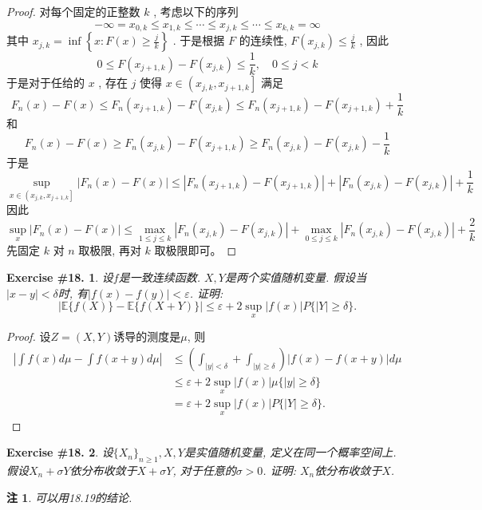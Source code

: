 \documentclass[UTF8, a4paper]{article}
\newtheorem{exercise}{Exercise \#18.}
\newtheorem*{remark}{注}
\begin{document}
\begin{proof}
对每个固定的正整数 $k$ , 考虑以下的序列
$$
-\infty=x_{0, k} \leq x_{1, k} \leq \cdots \leq x_{j, k} \leq \cdots \leq x_{k, k}=\infty
$$
其中 $x_{j, k}=\inf \left\{x: F(x) \geq \frac{j}{k}\right\}$ . 
于是根据 $F$ 的连续性, $F\left(x_{j, k}\right) \leq \frac{j}{k}$ , 因此
$$
0 \leq F\left(x_{j+1, k}\right)-F\left(x_{j, k}\right) \leq \frac{1}{k}, \quad 0 \leq j<k
$$
于是对于任给的 $x$ , 存在 $j$ 使得 $x \in\left(x_{j, k}, x_{j+1, k}\right]$ 满足
$$
F_n(x)-F(x) \leq F_n\left(x_{j+1, k}\right)-F\left(x_{j, k}\right) \leq F_n\left(x_{j+1, k}\right)-F\left(x_{j+1, k}\right)+\frac{1}{k}
$$
和
$$
F_n(x)-F(x) \geq F_n\left(x_{j, k}\right)-F\left(x_{j+1, k}\right) \geq F_n\left(x_{j, k}\right)-F\left(x_{j, k}\right)-\frac{1}{k}
$$
于是
$$
\sup _{x \in\left(x_{j, k}, x_{j+1, k}\right]}\left|F_n(x)-F(x)\right| \leq\left|F_n\left(x_{j+1, k}\right)-F\left(x_{j+1, k}\right)\right|+\left|F_n\left(x_{j, k}\right)-F\left(x_{j, k}\right)\right|+\frac{1}{k}
$$
因此
$$
\sup _x\left|F_n(x)-F(x)\right| \leq \max _{1 \leq j \leq k}\left|F_n\left(x_{j, k}\right)-F\left(x_{j, k}\right)\right|+\max _{0 \leq j \leq k}\left|F_n\left(x_{j, k}\right)-F\left(x_{j, k}\right)\right|+\frac{2}{k}
$$
先固定 $k$ 对 $n$ 取极限, 再对 $k$ 取极限即可。
\end{proof}




\begin{framed}
\begin{exercise}
设\(f\)是一致连续函数. \(X,Y\)是两个实值随机变量.
假设当\(|x-y| < \delta\)时, 有\(|f(x) - f(y)| < \varepsilon\). 证明:
$$
|\mathbb{E}\{f(X)\}-\mathbb{E}\{f(X+Y)\}| \leq \varepsilon+2 \sup _x|f(x)| P\{|Y| \geq \delta\} .
$$
\end{exercise}
\end{framed}

\begin{proof}
设\(Z = (X,Y)\)诱导的测度是\(\mu\), 则
$$
\begin{aligned}
    \left|\int f(x) d\mu - \int f(x + y) d\mu\right| &\leq \left(\int_{|y| < \delta} + \int_{|y| \geq \delta}\right) |f(x) - f(x+y)| d\mu \\
    &\leq \varepsilon  + 2\sup_x |f(x)| \mu\{|y| \geq \delta\} \\
    &= \varepsilon + 2\sup_x |f(x)| P\{|Y| \geq \delta\}.
\end{aligned}
$$
\end{proof}


\begin{framed}
\begin{exercise}
设\(\{X_n\}_{n \geq 1}, X, Y\)是实值随机变量, 定义在同一个概率空间上.
假设\(X_n + \sigma Y\)依分布收敛于\(X + \sigma Y\), 对于任意的\(\sigma > 0\).
证明: \(X_n\)依分布收敛于\(X\).
\end{exercise}
\end{framed}
\begin{remark}
可以用18.19的结论.
\end{remark}
\end{document}
